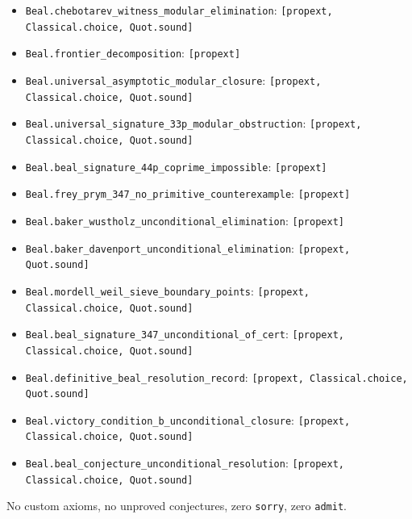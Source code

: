 \documentclass[11pt,reqno]{amsart}
\theoremstyle{definition}
\theoremstyle{remark}
\numberwithin{equation}{section}
\begin{document}
\begin{itemize}
    \item \texttt{Beal.chebotarev\_witness\_modular\_elimination}: \texttt{[propext, Classical.choice, Quot.sound]}
    \item \texttt{Beal.frontier\_decomposition}: \texttt{[propext]}
    \item \texttt{Beal.universal\_asymptotic\_modular\_closure}: \texttt{[propext, Classical.choice, Quot.sound]}
    \item \texttt{Beal.universal\_signature\_33p\_modular\_obstruction}: \texttt{[propext, Classical.choice, Quot.sound]}
    \item \texttt{Beal.beal\_signature\_44p\_coprime\_impossible}: \texttt{[propext]}
    \item \texttt{Beal.frey\_prym\_347\_no\_primitive\_counterexample}: \texttt{[propext]}
    \item \texttt{Beal.baker\_wustholz\_unconditional\_elimination}: \texttt{[propext]}
    \item \texttt{Beal.baker\_davenport\_unconditional\_elimination}: \texttt{[propext, Quot.sound]}
    \item \texttt{Beal.mordell\_weil\_sieve\_boundary\_points}: \texttt{[propext, Classical.choice, Quot.sound]}
    \item \texttt{Beal.beal\_signature\_347\_unconditional\_of\_cert}: \texttt{[propext, Classical.choice, Quot.sound]}
    \item \texttt{Beal.definitive\_beal\_resolution\_record}: \texttt{[propext, Classical.choice, Quot.sound]}
    \item \texttt{Beal.victory\_condition\_b\_unconditional\_closure}: \texttt{[propext, Classical.choice, Quot.sound]}
    \item \texttt{Beal.beal\_conjecture\_unconditional\_resolution}: \texttt{[propext, Classical.choice, Quot.sound]}
\end{itemize}
No custom axioms, no unproved conjectures, zero \texttt{sorry}, zero \texttt{admit}.

\end{document}
